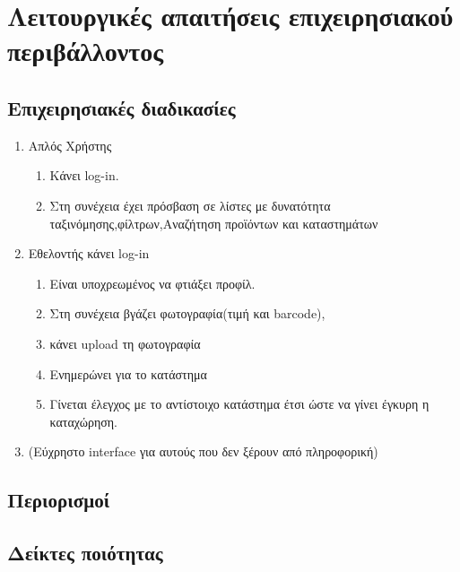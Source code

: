 \section{Λειτουργικές απαιτήσεις επιχειρησιακού περιβάλλοντος}



\subsection{Επιχειρησιακές διαδικασίες}

\begin{enumerate}
	\item Απλός Χρήστης
	\begin{enumerate}
		\item Κάνει log-in.
		\item Στη συνέχεια έχει πρόσβαση σε λίστες με δυνατότητα ταξινόμησης,φίλτρων,Αναζήτηση προϊόντων και καταστημάτων
	\end{enumerate}

	\item Εθελοντής κάνει log-in 
	\begin{enumerate}
		\item Είναι υποχρεωμένος να φτιάξει προφίλ.
		\item Στη συνέχεια βγάζει φωτογραφία(τιμή και barcode),
		\item κάνει upload τη φωτογραφία 
		\item Ενημερώνει για το κατάστημα
		\item Γίνεται έλεγχος με το αντίστοιχο κατάστημα έτσι ώστε να γίνει έγκυρη η καταχώρηση.
	\end{enumerate}

	\item (Εύχρηστο interface για αυτούς που δεν ξέρουν από πληροφορική)

\end{enumerate}

\subsection{Περιορισμοί}



\subsection{Δείκτες ποιότητας}


